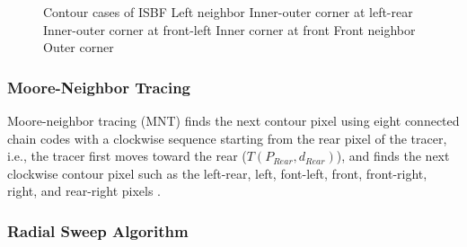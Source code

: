 \begin{figure}[htbp]
	\caption{Contour cases of ISBF \cite{Cheong2012Advanced} \protect{} Left neighbor \protect{} Inner-outer corner at left-rear  \protect{} Inner-outer corner at front-left  \protect{} Inner corner at front \protect{} Front neighbor \protect{} Outer corner}
	\label{fig:image4}
\end{figure}

\subsubsection{Moore-Neighbor Tracing}
Moore-neighbor tracing (MNT) finds the next contour pixel using eight connected chain codes with a clockwise sequence starting from the rear pixel of the tracer, i.e., the tracer first moves toward the rear ($T (P_{Rear}, d_{Rear})$), and finds the next clockwise contour pixel such as the left-rear, left, font-left, front, front-right, right, and rear-right pixels \cite{Toussaint????Grids, Ghuneim2015Contour}. 


\subsubsection{Radial Sweep Algorithm}

